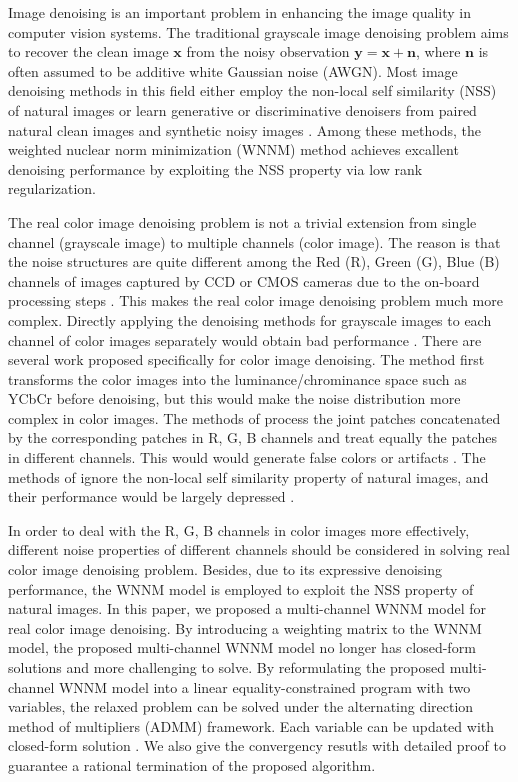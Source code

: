 \documentclass[10pt,twocolumn,letterpaper,sort&compress]{article}
\begin{document}
Image denoising is an important problem in enhancing the image quality in computer vision systems. The traditional grayscale image denoising problem aims to recover the clean image $\mathbf{x}$ from the noisy observation $\mathbf{y}=\mathbf{x}+\mathbf{n}$, where $\mathbf{n}$ is often assumed to be additive white Gaussian noise (AWGN). Most image denoising methods in this field either employ the non-local self similarity (NSS) of natural images \cite{nlm,bm3d,ksvd,lssc,ncsr,pgpd,wnnm} or learn generative or discriminative denoisers from paired natural clean images and synthetic noisy images \cite{foe,epll,mlp,csf,chen2015learning}. Among these methods, the weighted nuclear norm minimization (WNNM) method achieves excallent denoising performance by exploiting the NSS property via low rank regularization. 

The real color image denoising problem is not a trivial extension from single channel (grayscale image) to multiple channels (color image). The reason is that the noise structures are quite different among the Red (R), Green (G), Blue (B) channels of images captured by CCD or CMOS cameras due to the on-board processing steps \cite{karaimer_brown_ECCV_2016}. This makes the real color image denoising problem much more complex. Directly applying the denoising methods for grayscale images to each channel of color images separately would obtain bad performance \cite{mairal2008sparse}. There are several work  \cite{cbm3d,mairal2008sparse,Liu2008,noiseclinic,crosschannel2016,Zhu_2016_CVPR} proposed specifically for color image denoising. The method \cite{cbm3d} first transforms the color images into the luminance/chrominance space such as YCbCr before denoising, but this would make the noise distribution more complex in color images. The methods of \cite{mairal2008sparse,Zhu_2016_CVPR} process the joint patches concatenated by the corresponding patches in R, G, B channels and treat equally the patches in different channels. This would would generate false colors or artifacts \cite{mairal2008sparse}. The methods of \cite{Liu2008,noiseclinic,crosschannel2016} ignore the non-local self similarity property of natural images, and their performance would be largely depressed \cite{bm3d,wnnm}.

In order to deal with the R, G, B channels in color images more effectively, different noise properties of different channels should be considered in solving real color image denoising problem. Besides, due to its expressive denoising performance, the WNNM model \cite{wnnm} is employed to exploit the NSS property of natural images. In this paper, we proposed a multi-channel WNNM model for real color image denoising. By introducing a weighting matrix to the WNNM model, the proposed multi-channel WNNM model no longer has closed-form solutions and more challenging to solve. By reformulating the proposed multi-channel WNNM model into a linear equality-constrained program with two variables, the relaxed problem can be solved under the alternating direction method of multipliers (ADMM) \cite{admm} framework. Each variable can be updated with closed-form solution \cite{wnnm,lugsvt}. We also give the convergency resutls with detailed proof to guarantee a rational termination of the proposed algorithm. 
\end{document}

